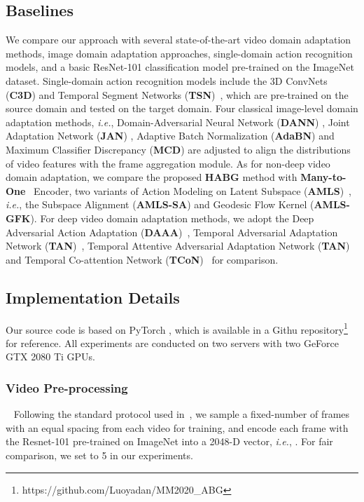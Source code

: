 \subsection{Baselines}
We compare our approach with several state-of-the-art video domain adaptation methods, image domain adaptation approaches, single-domain action recognition models, and a basic ResNet-101 classification model pre-trained on the ImageNet dataset. Single-domain action recognition models include the 3D ConvNets (\textbf{C3D}) \cite{C3D} and Temporal Segment Networks (\textbf{TSN})~\cite{TSN}, which are pre-trained on the source domain and tested on the target domain. Four classical image-level domain adaptation methods, \textit{i.e.}, Domain-Adversarial Neural Network (\textbf{DANN}) \cite{DANN}, Joint Adaptation Network (\textbf{JAN}) \cite{JAN}, Adaptive Batch Normalization (\textbf{AdaBN}) \cite{AdaBN} and Maximum Classifier Discrepancy (\textbf{MCD}) \cite{MCD} are adjusted to align the distributions of video features with the frame aggregation module. As for non-deep video domain adaptation, we compare the proposed \textbf{HABG} method with \textbf{Many-to-One}~\cite{DBLP:journals/ivc/XuZWF16} Encoder, two variants of Action Modeling on Latent Subspace (\textbf{AMLS})~\cite{AMLS}, \textit{i.e.}, the Subspace Alignment (\textbf{AMLS-SA}) and Geodesic Flow Kernel (\textbf{AMLS-GFK}). For deep video domain adaptation methods, we adopt the Deep Adversarial Action Adaptation (\textbf{DAAA})~\cite{AMLS}, Temporal Adversarial Adaptation Network (\textbf{TAN})~\cite{TAN}, Temporal Attentive Adversarial Adaptation Network (\textbf{TAN})~\cite{TAN} and Temporal Co-attention Network (\textbf{TCoN})~\cite{TcoN} for comparison.



\subsection{Implementation Details} Our source code is based on PyTorch \cite{pytorch}, which is available in a Githu repository\footnote{https://github.com/Luoyadan/MM2020\_ABG} for reference. All experiments are conducted on two servers with two GeForce GTX 2080 Ti GPUs.

\subsubsection{Video Pre-processing}~\label{dp}
Following the standard protocol used in~\cite{TAN}, we sample a fixed-number  of frames with an equal spacing from each video for training, and encode each frame with the Resnet-101 \cite{resnet} pre-trained on ImageNet into a 2048-D vector, \textit{i.e.}, . For fair comparison, we set  to 5 in our experiments.


